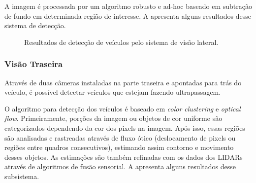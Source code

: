 A imagem é processada por um algoritmo robusto e ad-hoc baseado em subtração de fundo em determinada região de interesse. A  apresenta alguns resultados desse sistema de detecção.

\begin{figure}[h]
\centering
{}\quad
{}
\caption{Resultados de detecção de veículos pelo sistema de visão lateral.}%
\label{fig:lateral}%
\end{figure}

\subsubsection{Visão Traseira}

Através de duas câmeras instaladas na parte traseira e apontadas para trás do veículo, é possível detectar veículos que estejam fazendo ultrapassagem.

O algoritmo para detecção dos veículos é baseado em \emph{color clustering} e \emph{optical flow}. Primeiramente, porções da imagem ou objetos de cor uniforme são categorizados dependendo da cor dos pixels na imagem. Após isso, essas regiões são analisadas e rastreadas através de fluxo ótico (deslocamento de pixels ou regiões entre quadros consecutivos), estimando assim contorno e movimento desses objetos. As estimações são também refinadas com os dados dos LIDARs através de algoritmos de fusão sensorial. A  apresenta alguns resultados desse subsistema.

